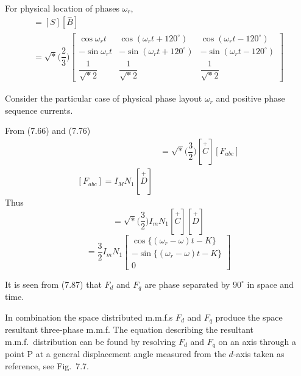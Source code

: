 \documentclass[a4paper,numbers=noenddot,12pt]{scrbook}
\begin{document}
    For physical location of phases $\omega_r$,  %
    \begin{multline}
        [\overset{-}{C}] = [S] [\overset{-}{B}] \\
        = \sqrt*{\Big( \dfrac{2}{3} \Big)}
        \begin{bmatrix}
            \cos \omega_r t & \cos (\omega_r t + 120^{\circ}) & \cos (\omega_r t - 120^{\circ}) \\
            - \sin \omega_r t & - \sin (\omega_r t + 120^{\circ}) & - \sin (\omega_r t - 120^{\circ}) \\
            \dfrac{1}{\sqrt*{2}} & \dfrac{1}{\sqrt*{2}} & \dfrac{1}{\sqrt*{2}}
        \end{bmatrix}
        \label{eq:Eq7.83}
    \end{multline}

    Consider the particular  case of physical phase layout $\omega_r$ and positive phase sequence currents. %

    From (7.66) and  (7.76)
    \begin{align}
        [F_{d q \gamma}] &=  \sqrt*{\Big( \dfrac{3}{2} \Big)} [\overset{+}{C}] [F_{abc}] \\
        [F_{abc}] = I_M N_1 [\overset{+}{D}]
        \label{eq:Eq7.85}
    \end{align}
    Thus
    \begin{equation}
        [F_{d q \gamma}] =  \sqrt*{\Big( \dfrac{3}{2} \Big)} I_m N_1 [\overset{+}{C}] [\overset{+}{D}]
        \label{eq:Eq7.86}
    \end{equation}
    \begin{equation}
        [F_{d q \gamma}] = \dfrac{3}{2} I_m N_1
        \begin{bmatrix}
            \cos \{(\omega_r -\omega)t - K\} \\
            -\sin \{(\omega_r -\omega)t - K\} \\
            0
        \end{bmatrix}
        \label{eq:Eq7.87}
    \end{equation}

    It is seen from (7.87) that $F_d$ and $F_q$ are phase separated by $90^{\circ}$ in space and time.

    In combination the space distributed m.m.f.s $F_d$ and $F_q$ produce the space resultant three-phase m.m.f. The equation describing the resultant m.m.f.\ distribution can be found by resolving $F_d$ and $F_q$ on an axis through a point P at a general displacement angle measured from the $d$-axis taken as reference, see Fig.\ 7.7.
\end{document}

